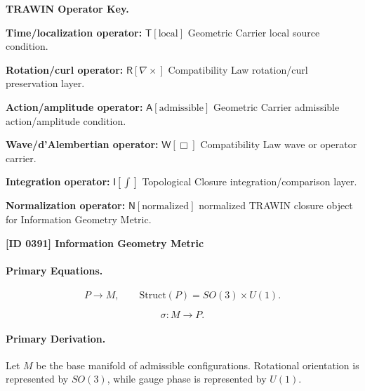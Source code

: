\par\vspace{0.45\baselineskip}
\noindent\begin{minipage}[t]{\linewidth}
\begingroup
\small
\raggedright
\textbf{TRAWIN Operator Key.}\par
\noindent\textbf{Time/localization operator:} $\mathsf{T}\!\left[\mathrm{local}\right]$ Geometric Carrier local source condition.\par
\noindent\textbf{Rotation/curl operator:} $\mathsf{R}\!\left[\nabla\times\right]$ Compatibility Law rotation/curl preservation layer.\par
\noindent\textbf{Action/amplitude operator:} $\mathsf{A}\!\left[\mathrm{admissible}\right]$ Geometric Carrier admissible action/amplitude condition.\par
\noindent\textbf{Wave/d'Alembertian operator:} $\mathsf{W}\!\left[\Box\right]$ Compatibility Law wave or operator carrier.\par
\noindent\textbf{Integration operator:} $\mathsf{I}\!\left[\int\right]$ Topological Closure integration/comparison layer.\par
\noindent\textbf{Normalization operator:} $\mathsf{N}\!\left[\mathrm{normalized}\right]$ normalized TRAWIN closure object for Information Geometry Metric.\par
\endgroup
\end{minipage}

\clearpage
\noindent\textbf{[ID 0391] Information Geometry Metric}\par
\vspace{0.35em}
\paragraph{Primary Equations.}
\begin{equation}
P \longrightarrow M,
\qquad
\mathrm{Struct}(P)=SO(3)\times U(1).
\end{equation}

\begin{equation}
\sigma:M\longrightarrow P.
\end{equation}

\paragraph{Primary Derivation.}
Let $M$ be the base manifold of admissible configurations. Rotational orientation is represented by $SO(3)$, while gauge phase is represented by $U(1)$.

